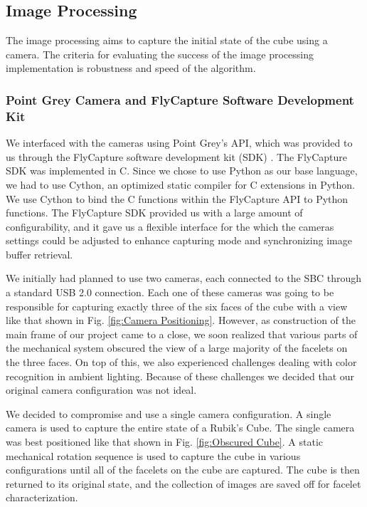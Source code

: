 \documentclass[final, letterpaper, 10 pt, conference, twocolumn]{IEEEtran}
\begin{document}
\subsection{Image Processing}
The image processing aims to capture the initial state of the cube using a camera. The criteria for evaluating the success of the image processing implementation is robustness and speed of the algorithm.

\subsubsection{Point Grey Camera and FlyCapture Software Development Kit}
We interfaced with the cameras using Point Grey's API, which was provided to us through the FlyCapture software development kit (SDK) \cite{FlyCapture}. The FlyCapture SDK was implemented in C. Since we chose to use Python as our base language, we had to use Cython, an optimized static compiler for C extensions in Python. We use Cython to bind the C functions within the FlyCapture API to Python functions.  The FlyCapture SDK  provided us with a large amount of configurability, and it gave us a flexible interface for the which the cameras settings could be adjusted to enhance capturing mode and synchronizing image buffer retrieval.

We initially had planned to use two cameras, each connected to the SBC through a standard USB 2.0 connection. Each one of these cameras was going to be responsible for capturing exactly three of the six faces of the cube with a view like that shown in Fig. \ref{fig:Camera Positioning}. However, as construction of the main frame of our project came to a close, we soon realized that various parts of the mechanical system obscured the view of a large majority of the facelets on the three faces. On top of this, we also experienced challenges dealing with color recognition in ambient lighting. Because of these challenges we decided that our original camera configuration was not ideal.

We decided to compromise and use a single camera configuration. A single camera is used to capture the entire state of a Rubik's Cube. The single camera was best positioned like that shown in Fig. \ref{fig:Obscured Cube}. A static mechanical rotation sequence is used to capture the cube in various configurations until all of the facelets on the cube are captured. The cube is then returned to its original state, and the collection of images are saved off for facelet characterization.
\end{document}
